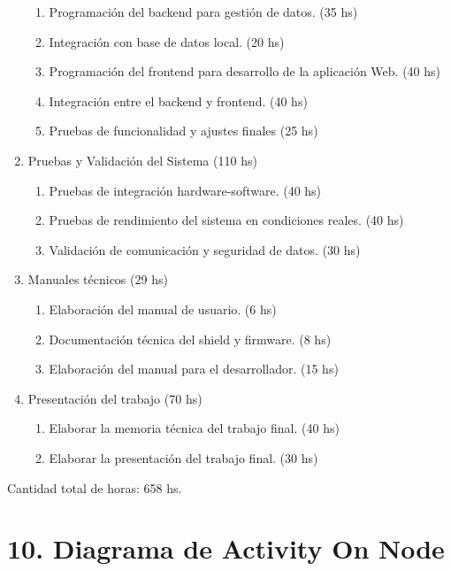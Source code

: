 \documentclass[
11pt, %
]{charter}
\begin{document}
\begin{enumerate}
\begin{enumerate}
	\item Programación del backend para gestión de datos. (35 hs)
	\item Integración con base de datos local. (20 hs)
	\item Programación del frontend para desarrollo de la aplicación Web. (40 hs)
	\item Integración entre el backend y frontend. (40 hs)
	\item Pruebas de funcionalidad y ajustes finales (25 hs)
	\end{enumerate}
\item Pruebas y Validación del Sistema (110 hs)
	\begin{enumerate}
	\item Pruebas de integración hardware-software. (40 hs)
	\item Pruebas de rendimiento del sistema en condiciones reales. (40 hs)
	\item Validación de comunicación y seguridad de datos. (30 hs)
	\end{enumerate}
\item Manuales técnicos (29 hs)
	\begin{enumerate}
	\item Elaboración del manual de usuario. (6 hs)
	\item Documentación técnica del shield y firmware. (8 hs)
	\item Elaboración del manual para el desarrollador. (15 hs)
	\end{enumerate}
\item Presentación del trabajo (70 hs)
	\begin{enumerate}
	\item Elaborar la memoria técnica del trabajo final. (40 hs)
	\item Elaborar la presentación del trabajo final. (30 hs)
	\end{enumerate}
\end{enumerate}

Cantidad total de horas: 658 hs.

\newpage
\section{10. Diagrama de Activity On Node}
\label{sec:AoN}
\end{document}
